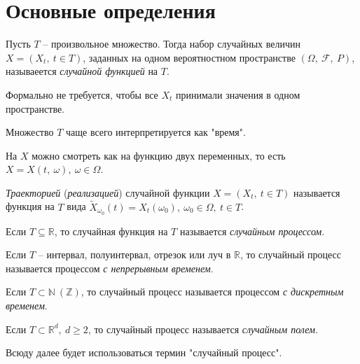 \section{Основные определения}
\begin{definition}
Пусть $\displaystyle T$ -- произвольное множество. Тогда набор случайных величин $\displaystyle X=( X_{t} ,\ t\in T)$, заданных на одном вероятностном пространстве $\displaystyle ( \Omega ,\ \mathcal{F} ,\ P)$, называеется \textit{случайной функцией} на $\displaystyle T$.
\end{definition}
\begin{note}
Формально не требуется, чтобы все $\displaystyle X_{t}$ принимали значения в одном пространстве.
\end{note}
\begin{note}
Множество $\displaystyle T$ чаще всего интерпретируется как "время".
\end{note}
\begin{note}
На $\displaystyle X$ можно смотреть как на функцию двух переменных, то есть $\displaystyle X=X( t,\ \omega ) ,\ \omega \in \Omega $.
\end{note}
\begin{definition}
\textit{Траекторией} (\textit{реализацией}) случайной функции $\displaystyle X=( X_{t} ,\ t\in T)$ называется функция на $\displaystyle T$ вида $\displaystyle \tilde{X}_{\omega _{0}}( t) =X_{t}( \omega _{0}) ,\ \omega _{0} \in \Omega ,\ t\in T$.
\end{definition}
\begin{definition}
Если $\displaystyle T\subseteq \mathbb{R}$, то случайная функция на $\displaystyle T$ называется \textit{случайным процессом}.
\end{definition}
\begin{definition}
Если $\displaystyle T$ -- интервал, полуинтервал, отрезок или луч в $\displaystyle \mathbb{R}$, то случайный процесс называется процессом \textit{с непрерывным временем}.
\end{definition}
\begin{definition}
Если $\displaystyle T\subset \mathbb{N} \ (\mathbb{Z})$, то случайный процесс называется процессом \textit{с дискретным временем}.
\end{definition}
\begin{definition}
Если $\displaystyle T\subset \mathbb{R}^{d} ,\ d\geqslant 2$, то случайный процесс называется \textit{случайным полем}.
\end{definition}
\begin{note}
Всюду далее будет использоваться термин "случайный процесс".
\end{note}
